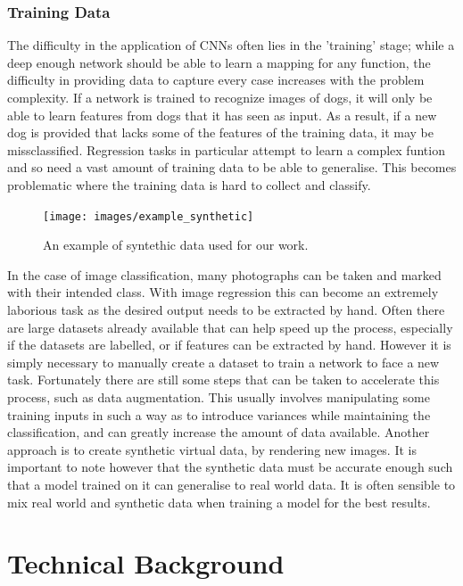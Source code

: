 \documentclass[ %
                    author={Gavin Parker},
                supervisor={Dr. Neill Campbell},
                    degree={MEng},
                     title={Deep Siamese Networks for Illumination Estimation from Stereo Images},
                  subtitle={},
                      type={research},
                      year={2018} ]{dissertation}
\begin{document}
\subsection{Training Data}
The difficulty in the application of CNNs often lies in the 'training' stage; while a deep enough network should be able to learn a mapping for any function, the difficulty in providing data to capture every case increases with the problem complexity. If a network is trained to recognize images of dogs, it will only be able to learn features from dogs that it has seen as input. As a result, if a new dog is provided that lacks some of the features of the training data, it may be missclassified. Regression tasks in particular attempt to learn a complex funtion and so need a vast amount of training data to be able to generalise. This becomes problematic where the training data is hard to collect and classify.
\begin{figure}
\texttt{[image: images/example\_synthetic]}
\centering
\caption{An example of syntethic data used for our work.}
\end{figure}
In the case of image classification, many photographs can be taken and marked with their intended class. With image regression this can become an extremely laborious task as the desired output needs to be extracted by hand. Often there are large datasets already available that can help speed up the process, especially if the datasets are labelled, or if features can be extracted by hand. However it is simply necessary to manually create a dataset to train a network to face a new task. Fortunately there are still some steps that can be taken to accelerate this process, such as data augmentation. This usually involves manipulating some training inputs in such a way as to introduce variances while maintaining the classification, and can greatly increase the amount of data available.
Another approach is to create synthetic virtual data, by rendering new images. It is important to note however that the synthetic data must be accurate enough such that a model trained on it can generalise to real world data. It is often sensible to mix real world and synthetic data when training a model for the best results.




\chapter{Technical Background}
\label{chap:technical}
\end{document}
